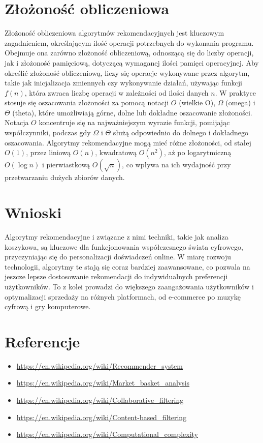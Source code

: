 \documentclass{article}
\begin{document}
\section{Złożoność obliczeniowa}
Złożoność obliczeniowa algorytmów rekomendacyjnych jest kluczowym zagadnieniem, określającym ilość operacji potrzebnych do wykonania programu. Obejmuje ona zarówno złożoność obliczeniową, odnoszącą się do liczby operacji, jak i złożoność pamięciową, dotyczącą wymaganej ilości pamięci operacyjnej. Aby określić złożoność obliczeniową, liczy się operacje wykonywane przez algorytm, takie jak inicjalizacja zmiennych czy wykonywanie działań, używając funkcji \( f(n) \), która zwraca liczbę operacji w zależności od ilości danych \( n \).
W praktyce stosuje się oszacowania złożoności za pomocą notacji \( O \) (wielkie O), \( \Omega \) (omega) i \( \Theta \) (theta), które umożliwiają górne, dolne lub dokładne oszacowanie złożoności. Notacja \( O \) koncentruje się na najważniejszym wyrazie funkcji, pomijając współczynniki, podczas gdy \( \Omega \) i \( \Theta \) służą odpowiednio do dolnego i dokładnego oszacowania. Algorytmy rekomendacyjne mogą mieć różne złożoności, od stałej \( O(1) \), przez liniową \( O(n) \), kwadratową \( O(n^2) \), aż po logarytmiczną \( O(\log n) \) i pierwiastkową \( O(\sqrt{n}) \), co wpływa na ich wydajność przy przetwarzaniu dużych zbiorów danych.

\section{Wnioski}
Algorytmy rekomendacyjne i związane z nimi techniki, takie jak analiza koszykowa, są kluczowe dla funkcjonowania współczesnego świata cyfrowego, przyczyniając się do personalizacji doświadczeń online. W miarę rozwoju technologii, algorytmy te stają się coraz bardziej zaawansowane, co pozwala na jeszcze lepsze dostosowanie rekomendacji do indywidualnych preferencji użytkowników. To z kolei prowadzi do większego zaangażowania użytkowników i optymalizacji sprzedaży na różnych platformach, od e-commerce po muzykę cyfrową i gry komputerowe.

\section{Referencje}
\begin{itemize}
    \item \url{https://en.wikipedia.org/wiki/Recommender_system}
    \item \url{https://en.wikipedia.org/wiki/Market_basket_analysis}
    \item \url{https://en.wikipedia.org/wiki/Collaborative_filtering}
    \item \url{https://en.wikipedia.org/wiki/Content-based_filtering}
    \item \url{https://en.wikipedia.org/wiki/Computational_complexity}
\end{itemize}
\end{document}

